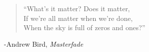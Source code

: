 
\chapter*{}

\begin{quote}

``What's it matter? Does it matter, \\
If we're all matter when we're done, \\
When the sky is full of zeros and ones?''

\end{quote}

\vspace{1in}
\hspace{2in}
-Andrew Bird, {\it Masterfade}
